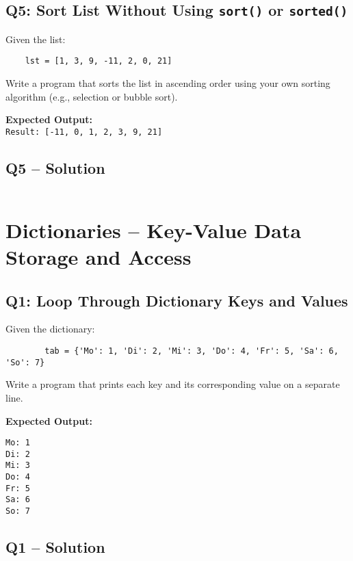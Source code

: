 \documentclass[a4paper,11pt]{article}
\begin{document}
\subsection*{Q5: Sort List Without Using \texttt{sort()} or \texttt{sorted()}}
Given the list:

\begin{verbatim}
	lst = [1, 3, 9, -11, 2, 0, 21]
\end{verbatim}

Write a program that sorts the list in ascending order using your own sorting algorithm (e.g., selection or bubble sort).

\textbf{Expected Output:}\\
\texttt{Result: [-11, 0, 1, 2, 3, 9, 21]}


\subsection*{Q5 – Solution}
\inputminted{python}{Files/7/5.py}

\newpage
	\section{Dictionaries – Key-Value Data Storage and Access}
	
	\subsection*{Q1: Loop Through Dictionary Keys and Values}
	Given the dictionary:
	
	\begin{verbatim}
		tab = {'Mo': 1, 'Di': 2, 'Mi': 3, 'Do': 4, 'Fr': 5, 'Sa': 6, 'So': 7}
	\end{verbatim}
	
	Write a program that prints each key and its corresponding value on a separate line.
	
	\textbf{Expected Output:}
	\begin{flushleft}
		\texttt{Mo: 1\\Di: 2\\Mi: 3\\Do: 4\\Fr: 5\\Sa: 6\\So: 7}
	\end{flushleft}
	
	\subsection*{Q1 – Solution}
	\inputminted{python}{Files/8/1.py}
	
\end{document}
